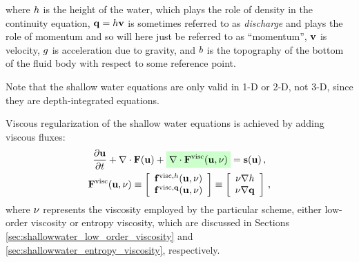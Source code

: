 where $h$ is the height of the water, which plays the role of density
in the continuity equation, $\mathbf{q}=h\mathbf{v}$ is sometimes
referred to as \emph{discharge} and plays the role of momentum and so will
here just be referred to as ``momentum'', $\mathbf{v}$ is velocity, $g$
is acceleration due to gravity, and $b$ is the topography of the
bottom of the fluid body with respect to some reference point.

Note that the shallow water equations are only valid in 1-D or 2-D, not 3-D,
since they are depth-integrated equations.

Viscous regularization of the shallow water equations is achieved by adding
viscous fluxes:
\begin{equation}
\begin{gathered}
  \ppt{\vectorsolution} + \nabla\cdot\consfluxvector
  + \highlightgreen{\nabla\cdot\viscconsfluxvector}
  = \conssource \eqc
\\
  \viscconsfluxvector
  \equiv \left[\begin{array}{c}
    \viscflux{\height}(\vectorsolution,\viscosity)\\
    \viscflux{\heightmomentum}(\vectorsolution,\viscosity)
    \end{array}\right]
  \equiv \left[\begin{array}{c}
    \viscosity\nabla\height\\
    \viscosity\nabla\heightmomentum
    \end{array}\right] \eqc
\end{gathered}
\end{equation}
where $\nu$ represents the viscosity employed by the particular
scheme, either low-order viscosity or entropy viscosity, which are discussed in
Sections \ref{sec:shallowwater_low_order_viscosity} and
\ref{sec:shallowwater_entropy_viscosity}, respectively.
